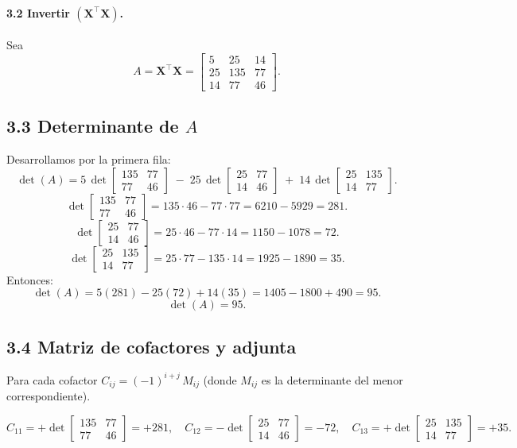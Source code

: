 \documentclass[10pt,a4paper]{article}
\begin{document}
\paragraph{3.2 Invertir $(\mathbf{X}^\top \mathbf{X})$.}


Sea
\[
A 
= 
\mathbf{X}^\top \mathbf{X}
=
\begin{bmatrix}
5 & 25 &14\\
25 &135 &77\\
14 & 77 &46
\end{bmatrix}.
\]

\subsection*{3.3 Determinante de $A$}

Desarrollamos por la primera fila:
\[
\det(A)
= 5\,
\det\begin{bmatrix}
135 & 77\\
77 & 46
\end{bmatrix}
\;-\;
25\,
\det\begin{bmatrix}
25 & 77\\
14 & 46
\end{bmatrix}
\;+\;
14\,
\det\begin{bmatrix}
25 &135\\
14 & 77
\end{bmatrix}.
\]
\[
\det\begin{bmatrix}
135 &77\\
77 &46
\end{bmatrix}
=135\cdot46 -77\cdot77=6210-5929=281.
\]
\[
\det\begin{bmatrix}
25 &77\\
14 &46
\end{bmatrix}
=25\cdot46 -77\cdot14=1150 -1078=72.
\]
\[
\det\begin{bmatrix}
25 &135\\
14 &77
\end{bmatrix}
=25\cdot77 -135\cdot14=1925 -1890=35.
\]
Entonces:
\[
\det(A)=5(281)-25(72)+14(35)=1405 -1800 +490=95.
\]
\[
\boxed{\det(A)=95.}
\]

\subsection*{3.4 Matriz de cofactores y adjunta}

Para cada cofactor $C_{ij}=(-1)^{i+j}\,M_{ij}$ (donde $M_{ij}$ es la determinante del menor correspondiente).

\[
C_{11} 
= +\det\begin{bmatrix}135 & 77\\ 77 &46\end{bmatrix} = +281,
\quad
C_{12} 
= -\det\begin{bmatrix}25 &77\\14 &46\end{bmatrix} = -72,
\quad
C_{13} 
= +\det\begin{bmatrix}25 &135\\14 &77\end{bmatrix} = +35.
\]
\end{document}
